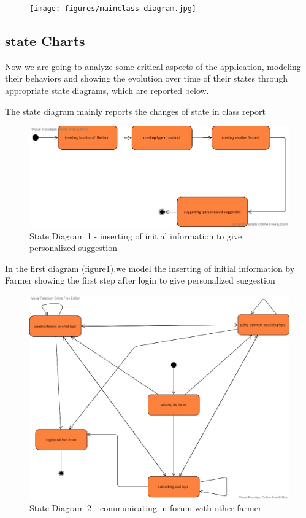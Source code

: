  \begin{figure}[H]
\texttt{[image: figures/mainclass diagram.jpg]}
\end{figure}
\subsection{state Charts}
Now we are going to analyze some critical aspects of the application, modeling their behaviors and showing the evolution over time of their states through appropriate state diagrams, which are reported below.
\newline

 \hspace{3cm} \footnotesize{ The state diagram mainly reports the changes of state in class report }
 \begin{figure}[H]
\includegraphics[width=1\textwidth]{figures/firstStateDiagram.jpg}
\caption{\label{fig:student } State Diagram 1 - inserting  of initial information to give personalized suggestion }
\end{figure}
In the first diagram (figure1),we model the inserting of initial information by Farmer  showing the first step after login to give personalized suggestion 


 \begin{figure}[H]
\includegraphics[width=1\textwidth]{figures/SecondStateDiagram.jpg}
\caption{\label{fig:student } State Diagram 2 - communicating in forum with other farmer }
\end{figure}

